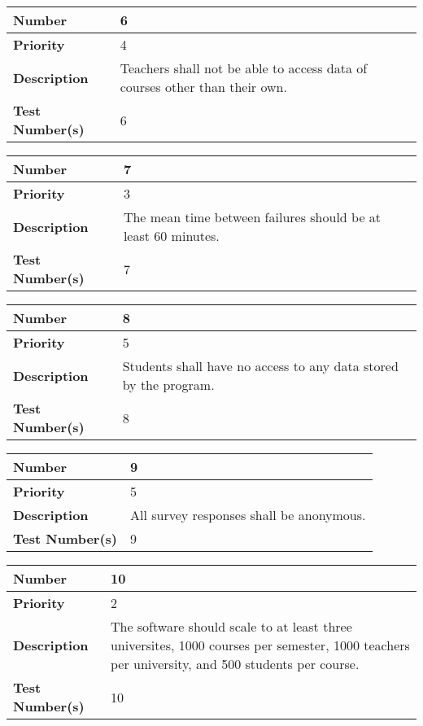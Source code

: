 \documentclass{article}
\begin{document}
\begin{center}
\bigskip
{}
\begin{tabular}{|p{3.5cm}|p{7.5cm}|} 
\hline
\textbf{Number} & 6  \\
\hline
\textbf{Priority} & 4\\ 
\hline
\textbf{Description} & Teachers shall not be able to access data of courses other than their own. \\ 
\hline
\textbf{Test Number(s) }& 6 \\ 
\hline
\end{tabular}


\bigskip
{}
\begin{tabular}{|p{3.5cm}|p{7.5cm}|} 
\hline
\textbf{Number} & 7  \\
\hline
\textbf{Priority} & 3\\ 
\hline
\textbf{Description} & The mean time between failures should be at least 60 minutes. \\ 
\hline
\textbf{Test Number(s) }& 7 \\ 
\hline
\end{tabular}


\bigskip
{}
\begin{tabular}{|p{3.5cm}|p{7.5cm}|} 
\hline
\textbf{Number} & 8  \\
\hline
\textbf{Priority} & 5\\ 
\hline
\textbf{Description} & Students shall have no access to any data stored by the program. \\ 
\hline
\textbf{Test Number(s) }& 8 \\ 
\hline
\end{tabular}


\bigskip
{}
\begin{tabular}{|p{3.5cm}|p{7.5cm}|} 
\hline
\textbf{Number} & 9  \\
\hline
\textbf{Priority} & 5 \\ 
\hline
\textbf{Description} & All survey responses shall be anonymous. \\ 
\hline
\textbf{Test Number(s) }& 9 \\ 
\hline
\end{tabular}


\bigskip
{}
\begin{tabular}{|p{3.5cm}|p{7.5cm}|} 
\hline
\textbf{Number} & 10  \\
\hline
\textbf{Priority} & 2\\ 
\hline
\textbf{Description} & The software should scale to at least three universites, 1000 courses per semester, 1000 teachers per university, and 500 students per course. \\ 
\hline
\textbf{Test Number(s) }& 10 \\ 
\hline
\end{tabular}



\end{center}
\end{document}
